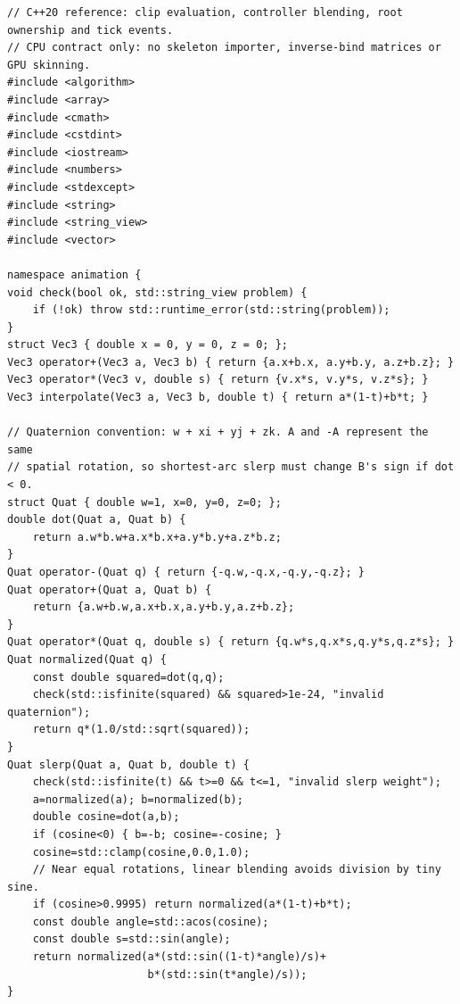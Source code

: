 \begin{verbatim}
// C++20 reference: clip evaluation, controller blending, root ownership and tick events.
// CPU contract only: no skeleton importer, inverse-bind matrices or GPU skinning.
#include <algorithm>
#include <array>
#include <cmath>
#include <cstdint>
#include <iostream>
#include <numbers>
#include <stdexcept>
#include <string>
#include <string_view>
#include <vector>

namespace animation {
void check(bool ok, std::string_view problem) {
    if (!ok) throw std::runtime_error(std::string(problem));
}
struct Vec3 { double x = 0, y = 0, z = 0; };
Vec3 operator+(Vec3 a, Vec3 b) { return {a.x+b.x, a.y+b.y, a.z+b.z}; }
Vec3 operator*(Vec3 v, double s) { return {v.x*s, v.y*s, v.z*s}; }
Vec3 interpolate(Vec3 a, Vec3 b, double t) { return a*(1-t)+b*t; }

// Quaternion convention: w + xi + yj + zk. A and -A represent the same
// spatial rotation, so shortest-arc slerp must change B's sign if dot < 0.
struct Quat { double w=1, x=0, y=0, z=0; };
double dot(Quat a, Quat b) {
    return a.w*b.w+a.x*b.x+a.y*b.y+a.z*b.z;
}
Quat operator-(Quat q) { return {-q.w,-q.x,-q.y,-q.z}; }
Quat operator+(Quat a, Quat b) {
    return {a.w+b.w,a.x+b.x,a.y+b.y,a.z+b.z};
}
Quat operator*(Quat q, double s) { return {q.w*s,q.x*s,q.y*s,q.z*s}; }
Quat normalized(Quat q) {
    const double squared=dot(q,q);
    check(std::isfinite(squared) && squared>1e-24, "invalid quaternion");
    return q*(1.0/std::sqrt(squared));
}
Quat slerp(Quat a, Quat b, double t) {
    check(std::isfinite(t) && t>=0 && t<=1, "invalid slerp weight");
    a=normalized(a); b=normalized(b);
    double cosine=dot(a,b);
    if (cosine<0) { b=-b; cosine=-cosine; }
    cosine=std::clamp(cosine,0.0,1.0);
    // Near equal rotations, linear blending avoids division by tiny sine.
    if (cosine>0.9995) return normalized(a*(1-t)+b*t);
    const double angle=std::acos(cosine);
    const double s=std::sin(angle);
    return normalized(a*(std::sin((1-t)*angle)/s)+
                      b*(std::sin(t*angle)/s));
}


\end{verbatim}
